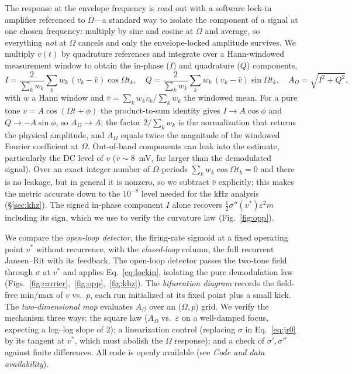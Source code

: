 \documentclass[11pt,a4paper]{article}
\newcommand{\Sig}{\sigma}
\newcommand{\half}{\tfrac{1}{2}}
\begin{document}
The response at the envelope frequency is read out with a software lock-in
amplifier referenced to $\Omega$---a standard way to isolate the component of a signal
at one chosen frequency: multiply by sine and cosine at $\Omega$ and average, so
everything \emph{not} at $\Omega$ cancels and only the envelope-locked amplitude
survives. We multiply $v(t)$ by quadrature references and
integrate over a Hann-windowed measurement window to obtain the in-phase ($I$) and
quadrature ($Q$) components,
\begin{equation}
I=\frac{2}{\sum_k w_k}\sum_k w_k\,(v_k-\bar v)\cos\Omega t_k,\quad
Q=\frac{2}{\sum_k w_k}\sum_k w_k\,(v_k-\bar v)\sin\Omega t_k,\quad
A_\Omega=\sqrt{I^2+Q^2},
\label{eq:lockin}
\end{equation}
with $w$ a Hann window and $\bar v=\sum_k w_k v_k/\sum_k w_k$ the windowed mean.
For a pure tone $v=A\cos(\Omega t+\phi)$ the product-to-sum identity gives
$I\to A\cos\phi$ and $Q\to -A\sin\phi$, so $A_\Omega\to A$; the factor
$2/\sum_k w_k$ is the normalization that returns the physical amplitude, and
$A_\Omega$ equals twice the magnitude of the windowed Fourier coefficient at
$\Omega$. Out-of-band components can leak into the estimate, particularly the DC level of $v$ ($\bar v\!\sim\!8$~mV, far
larger than the demodulated signal). Over an exact integer number of
$\Omega$-periods $\sum_k w_k\cos\Omega t_k=0$ and there is no leakage, but in
general it is nonzero, so we subtract $\bar v$ explicitly; this makes the metric
accurate down to the $10^{-8}$ level needed for the kHz
analysis (\S\ref{sec:khz}). The signed in-phase component $I$ alone recovers
$\half\Sig''(v^*)\varepsilon^2 m$ including its sign, which we use to verify the
curvature law (Fig.~\ref{fig:opp}).

We compare the \emph{open-loop detector}, the firing-rate sigmoid at a fixed
operating point $v^*$ without recurrence, with the \emph{closed-loop} column, the full recurrent
Jansen--Rit with its feedback. The open-loop detector passes the two-tone field through
$\Sig$ at $v^*$ and applies Eq.~\eqref{eq:lockin}, isolating the pure demodulation law
(Figs.~\ref{fig:carrier},~\ref{fig:opp},~\ref{fig:khz}). The \emph{bifurcation
diagram} records the field-free min/max of $v$ vs.\ $p$, each run initialized at
its fixed point plus a small kick. The \emph{two-dimensional map} evaluates
$A_\Omega$ over an ($\Omega,p$) grid. We verify the mechanism three ways: the
square law ($A_\Omega$ vs.\ $\varepsilon$ on a well-damped focus, expecting a
log--log slope of $2$); a linearization control (replacing $\Sig$ in
Eq.~\eqref{eq:jr0} by its tangent at $v^*$, which must abolish the $\Omega$
response); and a check of $\Sig',\Sig''$ against finite differences. All code is
openly available (see \emph{Code and data availability}).
\end{document}
